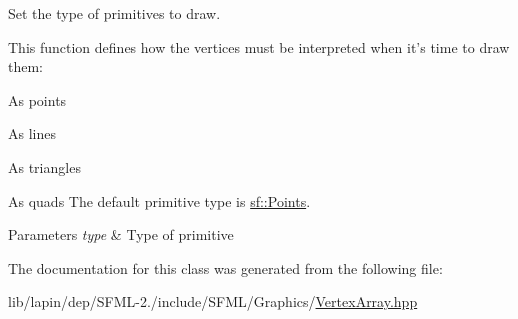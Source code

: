 Set the type of primitives to draw. 

This function defines how the vertices must be interpreted when it's time to draw them\-: \begin{DoxyItemize}
\item As points \item As lines \item As triangles \item As quads The default primitive type is \hyperlink{group__graphics_gga5ee56ac1339984909610713096283b1ba85cf551ca780a29ec5df3ee9fc282c22}{sf\-::\-Points}.\end{DoxyItemize}

\begin{DoxyParams}{Parameters}
{\em type} & Type of primitive \\
\hline
\end{DoxyParams}


The documentation for this class was generated from the following file\-:\begin{DoxyCompactItemize}
\item 
lib/lapin/dep/\-S\-F\-M\-L-\/2./include/\-S\-F\-M\-L/\-Graphics/\hyperlink{lapin_2dep_2_s_f_m_l-2_83_2include_2_s_f_m_l_2_graphics_2_vertex_array_8hpp}{Vertex\-Array.\-hpp}\end{DoxyCompactItemize}

